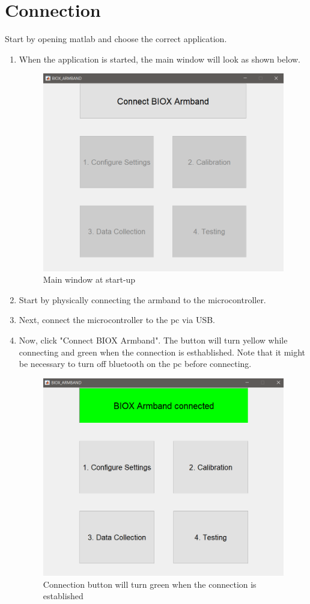 \chapter{Connection}
Start by opening matlab and choose the correct application.\\
\begin{enumerate}[label=\textbf{Step \arabic*}:]
    \item When the application is started, the main window will look as shown below.\\
    \begin{figure}[H]
        \centering
        \includegraphics[width=0.5\linewidth]{figures/AppPics/1_Startup_NEW.png}
        \caption{Main window at start-up}
        \label{fig:my_label}
    \end{figure}
    
    \item Start by physically connecting the armband to the microcontroller.%
    
    \item Next, connect the microcontroller to the pc via USB.
    
    \item Now, click "Connect BIOX Armband". The button will turn yellow while connecting and green when the connection is esthablished. Note that it might be necessary to turn off bluetooth on the pc before connecting.\\
    \begin{figure}[H]
        \centering
        \includegraphics[width=0.5\linewidth]{figures/AppPics/1_Startup_Connected_NEW.png}
        \caption{Connection button will turn green when the connection is established}
        \label{fig:my_label}
    \end{figure}
\end{enumerate}

